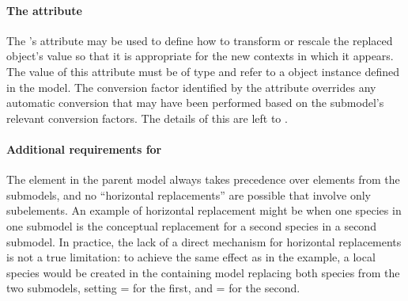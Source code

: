 %


\paragraph{The \hspace*{1pt} attribute}
\label{replacedelement-conversionfactor}

The \ReplacedElement's  attribute may be used to
define how to transform or rescale the replaced object's value so that
it is appropriate for the new contexts in which it appears.  The value
of this attribute must be of type  and refer to a
\Parameter object instance defined in the model.  The conversion factor
identified by the  attribute overrides any
automatic conversion that may have been performed based on the
submodel's relevant conversion factors.  The details of this are left to
.


\paragraph{Additional requirements for }
\label{replacedelement-additional}

The element in the parent model always takes precedence over elements
from the submodels, and no ``horizontal replacements'' are possible that
involve only subelements.  An example of horizontal replacement might be
when one species in one submodel is the conceptual replacement for a
second species in a second submodel.  In practice, the lack of a direct
mechanism for horizontal replacements is not a true limitation: to
achieve the same effect as in the example, a local species would be
created in the containing model replacing both species from the two
submodels, setting = for the first, and
= for the second.

